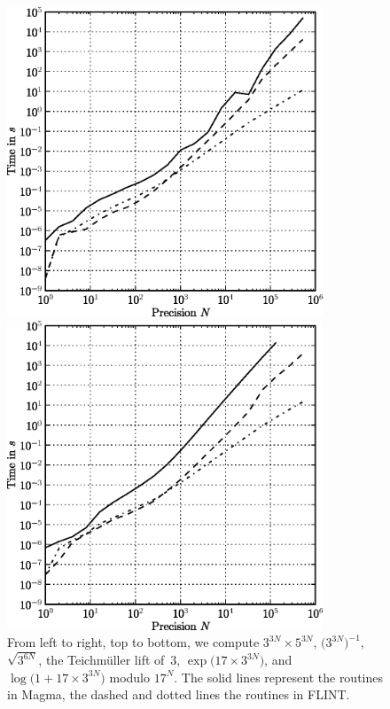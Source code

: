 \begin{figure}[ht]
\begin{minipage}[b]{0.5\linewidth}
\centering
\includegraphics[width=0.84\textwidth]{bin/qp-exp}
\end{minipage}
\begin{minipage}[b]{0.5\linewidth}
\centering
\includegraphics[width=0.84\textwidth]{bin/qp-log}
\end{minipage}
\caption{From left to right, top to bottom, we compute 
$3^{3N} \times 5^{3N}$, $\bigl(3^{3N}\bigr)^{-1}$, $\sqrt{3^{6 N}}$, 
the Teichm\"uller lift of~$3$, $\exp\bigl(17 \times 3^{3N}\bigr)$, and 
$\log\bigl(1 + 17 \times 3^{3N}\bigr)$ modulo $17^N$.  The solid 
lines represent the routines in {\sc Magma}, the dashed and dotted 
lines the routines in {\sc FLINT}.}
\label{fig:timings-qp}
\end{figure}

